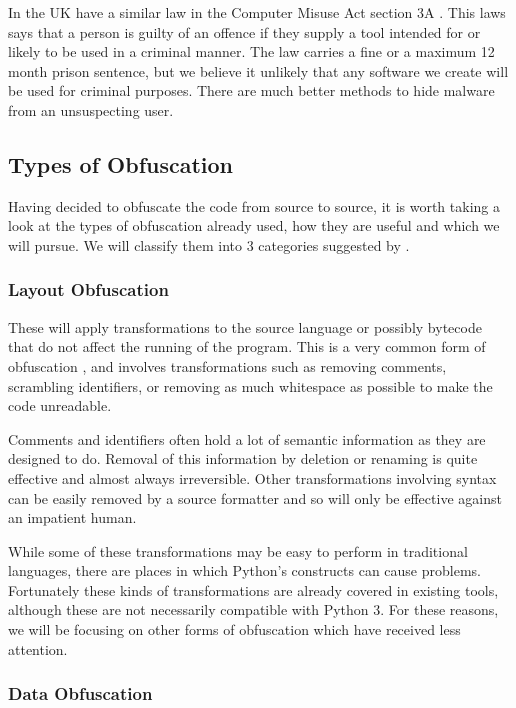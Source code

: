 \documentclass[twoside,a4paper]{report}
\begin{document}
In the UK have a similar law in the Computer Misuse Act section 3A \cite{compmisuse}. This laws says that a person is guilty of an offence
if they supply a tool intended for or likely to be used in a criminal manner. The law carries a fine or a maximum 12 month
prison sentence, but we believe it unlikely that any software we create will be used for criminal purposes. There are
much better methods to hide malware from an unsuspecting user.

\subsection{Types of Obfuscation}

Having decided to obfuscate the code from source to source, it is worth taking a look at the types of
obfuscation already used, how they are useful and which we will pursue. We will classify them into 3 categories
suggested by \cite[p10]{desevobf}.

\subsubsection{Layout Obfuscation}

These will apply transformations to the source language or possibly bytecode that do not affect the running of the
program. This is a very common form of obfuscation \cite[p10]{desevobf}, and involves transformations such as removing comments,
scrambling identifiers, or removing as much whitespace as possible to make the code unreadable.

Comments and identifiers often hold a lot of semantic information as they are designed to do.
Removal of this information by deletion or renaming is quite effective and almost always irreversible. Other transformations involving syntax
can be easily removed by a source formatter and so will only be effective against an impatient human.

While some of these transformations may be easy to perform in traditional languages, there are places in which
Python's constructs can cause problems. Fortunately these kinds of transformations are already covered in existing
tools, although these are not necessarily compatible with Python 3. For these reasons, we will be focusing on other forms of
obfuscation which have received less attention.

\subsubsection{Data Obfuscation}
\end{document}
